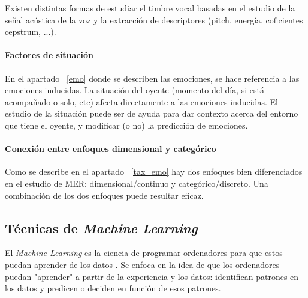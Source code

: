 \documentclass[12pt,a4paper,Spanish]{article}
\begin{document}
Existen distintas formas de estudiar el timbre vocal basadas en el estudio de la señal acústica de la voz y la extracción de descriptores (pitch, energía, coficientes cepstrum, ...).

\paragraph{Factores de situación}
En el apartado ~\ref{emo} donde se describen las emociones, se hace referencia a las emociones inducidas. La situación del oyente (momento del día, si está acompañado o solo, etc) afecta directamente a las emociones inducidas. El estudio de la situación puede ser de ayuda para dar contexto acerca del entorno que tiene el oyente, y modificar (o no) la predicción de emociones.

\paragraph{Conexión entre enfoques dimensional y categórico}\label{combi}
Como se describe en el apartado ~\ref{tax_emo} hay dos enfoques bien diferenciados en el estudio de MER: dimensional/continuo y categórico/discreto. Una combinación de los dos enfoques puede resultar eficaz.

\subsection{Técnicas de \textit{Machine Learning}}

El \textit{Machine Learning} es la ciencia de programar ordenadores para que estos puedan aprender de los datos \cite{geron2022hands}. Se enfoca en la idea de que los ordenadores puedan "aprender" a partir de la experiencia y los datos: identifican patrones en los datos y predicen o deciden en función de esos patrones.
\end{document}
